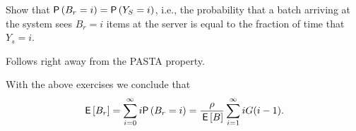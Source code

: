 \begin{exercise}
Show that $\P{B_r=i} =\P{Y_S=i}$, i.e.,  the probability that a batch arriving at the system sees  $B_r=i$ items at the server is equal to the fraction of time that $Y_s=i$.
\begin{solution}
Follows right away from the PASTA property.
\end{solution}
\end{exercise}

With the above exercises we conclude that
\begin{equation*}
  \E{B_r} = \sum_{i=0}^\infty i \P{B_r=i} = \frac{\rho}{\E B} \sum_{i=1}^\infty i G(i-1).
\end{equation*}









